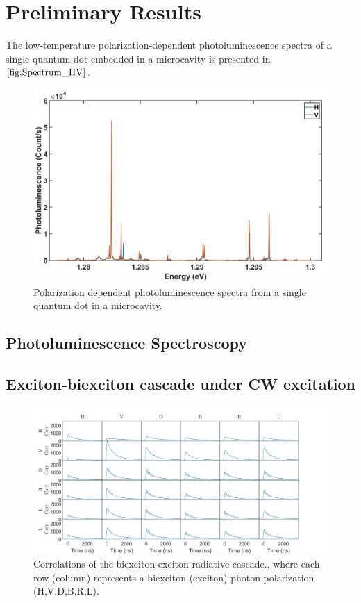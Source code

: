 \section{Preliminary Results}
The low-temperature polarization-dependent photoluminescence spectra of a single quantum dot embedded in a microcavity is presented in $\ref{fig:Spectrum_HV}$.
\begin{figure}[H]
		\centering
		\includegraphics[scale=0.3]{figures/Spectrum.jpg}
		\caption{Polarization dependent photoluminescence spectra from a single quantum dot in a microcavity.}
		\label{fig:Spectrum_HV}
	\end{figure}
\subsection{Photoluminescence Spectroscopy}
\subsection{Exciton-biexciton cascade under CW excitation}
\begin{figure}[H]
	\centering
	\includegraphics[scale=0.24]{figures/XX_X_Correlations.jpg}
	\caption{ Correlations of the biexciton-exciton radiative cascade., where each row (column) represents a biexciton (exciton) photon polarization (H,V,D,B,R,L).}
	\label{fig:PiSystem}
\end{figure}
